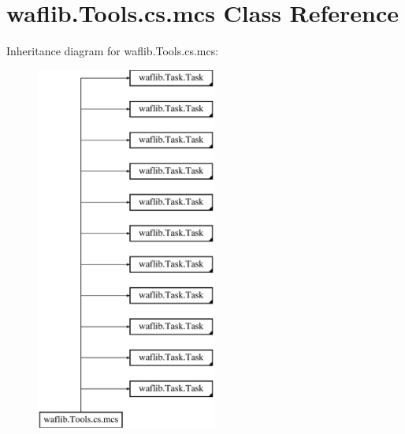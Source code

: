 \hypertarget{classwaflib_1_1_tools_1_1cs_1_1mcs}{}\section{waflib.\+Tools.\+cs.\+mcs Class Reference}
\label{classwaflib_1_1_tools_1_1cs_1_1mcs}
Inheritance diagram for waflib.\+Tools.\+cs.\+mcs\+:\begin{figure}[H]
\begin{center}
\leavevmode
\includegraphics[height=12.000000cm]{classwaflib_1_1_tools_1_1cs_1_1mcs}
\end{center}
\end{figure}
